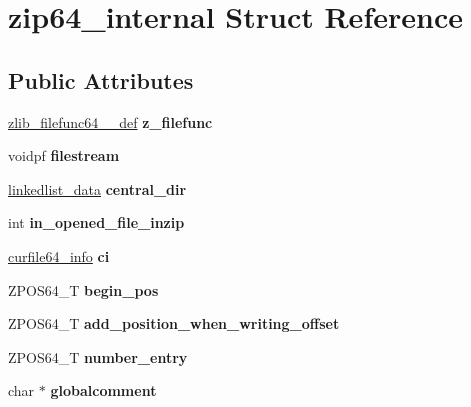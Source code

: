 \hypertarget{structzip64__internal}{}\section{zip64\+\_\+internal Struct Reference}
\label{structzip64__internal}
\subsection*{Public Attributes}
\begin{DoxyCompactItemize}
\item 
\mbox{\label{structzip64__internal_ac4ccb50738cbefbd40e075b297c65548}} 
\hyperlink{structzlib__filefunc64__32__def__s}{zlib\+\_\+filefunc64\+\_\+\_\+def} {\bfseries z\+\_\+filefunc}
\item 
\mbox{\label{structzip64__internal_a5b451e00303fe5192adf7c1d6740d754}} 
voidpf {\bfseries filestream}
\item 
\mbox{\label{structzip64__internal_a869144921e51ec758f1b60dba2f1a2af}} 
\hyperlink{structlinkedlist__data__s}{linkedlist\+\_\+data} {\bfseries central\+\_\+dir}
\item 
\mbox{\label{structzip64__internal_aa24353ae49bce7e6d6aa3f5994782be7}} 
int {\bfseries in\+\_\+opened\+\_\+file\+\_\+inzip}
\item 
\mbox{\label{structzip64__internal_a05bf290332d456dbecee6d870a3b6559}} 
\hyperlink{structcurfile64__info}{curfile64\+\_\+info} {\bfseries ci}
\item 
\mbox{\label{structzip64__internal_adff1d5f1509675f5f1c9797c5addc1a7}} 
Z\+P\+O\+S64\+\_\+T {\bfseries begin\+\_\+pos}
\item 
\mbox{\label{structzip64__internal_a1634cf696720f9fefb110c177fc642fa}} 
Z\+P\+O\+S64\+\_\+T {\bfseries add\+\_\+position\+\_\+when\+\_\+writing\+\_\+offset}
\item 
\mbox{\label{structzip64__internal_a2d8ae560933ed00ee61052446288f4a8}} 
Z\+P\+O\+S64\+\_\+T {\bfseries number\+\_\+entry}
\item 
\mbox{\label{structzip64__internal_af4b66a0cd4696a70496160979529a852}} 
char $\ast$ {\bfseries globalcomment}
\end{DoxyCompactItemize}



